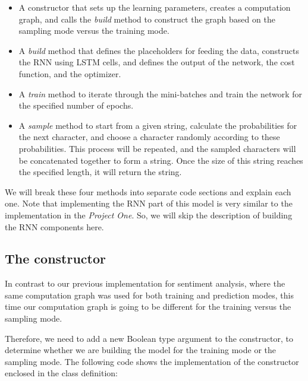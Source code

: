 \documentclass[11pt]{article}
\providecommand{\tightlist}{%
      \setlength{\itemsep}{0pt}\setlength{\parskip}{0pt}}
\begin{document}
\begin{itemize}
\tightlist
\item
  A constructor that sets up the learning parameters, creates a
  computation graph, and calls the \emph{build} method to construct the
  graph based on the sampling mode versus the training mode.
\item
  A \emph{build} method that defines the placeholders for feeding the
  data, constructs the RNN using LSTM cells, and defines the output of
  the network, the cost function, and the optimizer.
\item
  A \emph{train} method to iterate through the mini-batches and train
  the network for the specified number of epochs.
\item
  A \emph{sample} method to start from a given string, calculate the
  probabilities for the next character, and choose a character randomly
  according to these probabilities. This process will be repeated, and
  the sampled characters will be concatenated together to form a string.
  Once the size of this string reaches the specified length, it will
  return the string.
\end{itemize}

We will break these four methods into separate code sections and explain
each one. Note that implementing the RNN part of this model is very
similar to the implementation in the \emph{Project One}. So, we will
skip the description of building the RNN components here.

    \subsection{The constructor}\label{the-constructor}

    In contrast to our previous implementation for sentiment analysis, where
the same computation graph was used for both training and prediction
modes, this time our computation graph is going to be different for the
training versus the sampling mode.

Therefore, we need to add a new Boolean type argument to the
constructor, to determine whether we are building the model for the
training mode or the sampling mode. The following code shows the
implementation of the constructor enclosed in the class definition:
\end{document}
